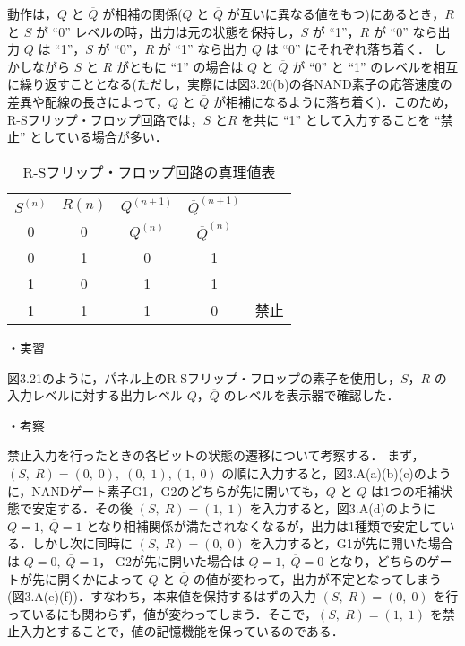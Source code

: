 動作は，$Q$ と $\overline{Q}$ が相補の関係($Q$ と $\overline{Q}$ が互いに異なる値をもつ)にあるとき，$R$ と $S$ が ``0'' レベルの時，出力は元の状態を保持し，$S$ が ``1''，$R$ が ``0'' なら出力 $Q$ は ``1''，$S$ が ``0''，$R$ が ``1'' なら出力 $Q$ は ``0'' にそれぞれ落ち着く．
しかしながら $S$ と $R$ がともに ``1'' の場合は $Q$ と $\overline{Q}$ が ``0'' と ``1'' のレベルを相互に繰り返すこととなる(ただし，実際には図3.20(b)の各NAND素子の応答速度の差異や配線の長さによって，$Q$ と $\overline{Q}$ が相補になるように落ち着く)．このため，R-Sフリップ・フロップ回路では，$S$ と$R$ を共に ``1'' として入力することを ``禁止'' としている場合が多い．

\begin{table}[!h]
    \caption{R-Sフリップ・フロップ回路の真理値表}
    \label{tbl12}
    \begin{center}
        \begin{tabular}{|c|c|c|c||c|}
            \hline
            $S^{(n)}$ & $R{(n)}$ & $Q^{(n+1)}$ & ${\overline{Q}}^{(n+1)}$ &      \\
            \hhline{|=|=|=|=#=|}
            0         & 0        & $Q^{(n)}$   & ${\overline{Q}}^{(n)}$   &      \\
            \hline
            0         & 1        & 0           & 1                        &      \\
            \hline
            1         & 0        & 1           & 1                        &      \\
            \hline
            1         & 1        & 1           & 0                        & 禁止 \\
            \hline
        \end{tabular}
    \end{center}
\end{table}

\newpage
\noindent
・実習 \vspace{2mm}

図3.21のように，パネル上のR-Sフリップ・フロップの素子を使用し，$S$，$R$ の入力レベルに対する出力レベル $Q$，$\overline{Q}$ のレベルを表示器で確認した．

\vspace{7mm}
\noindent
・考察 \vspace{2mm}

禁止入力を行ったときの各ビットの状態の遷移について考察する．
まず，$(S,\; R) = (0,\; 0),\; (0,\; 1), (1,\; 0)$ の順に入力すると，図3.A(a)(b)(c)のように，NANDゲート素子G1，G2のどちらが先に開いても，$Q$ と $\overline{Q}$ は1つの相補状態で安定する．その後 $(S,\; R) = (1,\; 1)$ を入力すると，図3.A(d)のように $Q = 1,\; \overline{Q} = 1$  となり相補関係が満たされなくなるが，出力は1種類で安定している．しかし次に同時に $(S,\; R) = (0,\; 0)$ を入力すると，G1が先に開いた場合は $Q = 0,\; \overline{Q} = 1$，
G2が先に開いた場合は $Q = 1,\; \overline{Q} = 0$ となり，どちらのゲートが先に開くかによって $Q$ と $\overline{Q}$ の値が変わって，出力が不定となってしまう(図3.A(e)(f))．すなわち，本来値を保持するはずの入力 $(S,\; R) = (0,\; 0)$ を行っているにも関わらず，値が変わってしまう．そこで，$(S,\; R) = (1,\; 1)$ を禁止入力とすることで，値の記憶機能を保っているのである．

